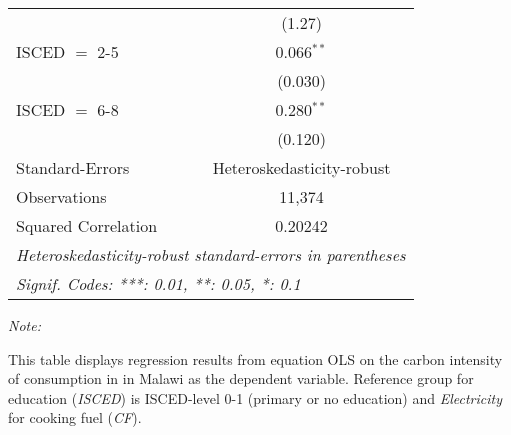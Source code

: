 \begin{table}[htbp!]
\begin{adjustbox}{width = 1\textwidth, max height = 0.95\textheight, center}
\begin{threeparttable}[b]
\begin{tabular}{lc}
                                & (1.27)\\   
            ISCED $=$ 2-5       & 0.066$^{**}$\\   
                                & (0.030)\\   
            ISCED $=$ 6-8       & 0.280$^{**}$\\   
                                & (0.120)\\   
            \midrule 
            Standard-Errors     & Heteroskedasticity-robust \\   
            Observations        & 11,374\\  
            Squared Correlation & 0.20242\\  
            \midrule \midrule
            \multicolumn{2}{l}{\emph{Heteroskedasticity-robust standard-errors in parentheses}}\\
            \multicolumn{2}{l}{\emph{Signif. Codes: ***: 0.01, **: 0.05, *: 0.1}}\\
         \end{tabular}
         
         \begin{tablenotes}\item \medskip \textit{Note:}
            \item This table displays regression results from equation OLS on the carbon intensity of consumption in  in Malawi as the dependent variable. Reference group for education (\textit{ISCED}) is ISCED-level 0-1 (primary or no education) and \textit{Electricity} for cooking fuel (\textit{CF}).
         \end{tablenotes}
      \end{threeparttable}
   \end{adjustbox}
\end{table}


